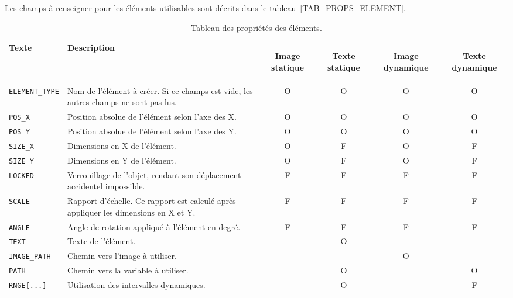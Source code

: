 \documentclass{AlstomLibrary}
\newcommand{\PROPSIZEX}{\index{Propriétés graphiques!SIZE\_X}\texttt{SIZE\_X}}
\newcommand{\PROPSIZEY}{\index{Propriétés graphiques!SIZE\_Y}\texttt{SIZE\_Y}}
\newcommand{\PROPPOSX}{\index{Propriétés graphiques!POS\_X}\texttt{POS\_X}}
\newcommand{\PROPPOSY}{\index{Propriétés graphiques!POS\_Y}\texttt{POS\_Y}}
\begin{document}
Les champs à renseigner pour les éléments utilisables sont décrits dans le tableau~\vref{TAB_PROPS_ELEMENT}.

\begin{table}\centering
\begin{tabular}{@{}lp{7cm}cccc}  \toprule%
Texte & Description & \begin{sideways}Image statique\end{sideways} & \begin{sideways}Texte statique\end{sideways} & \begin{sideways}Image dynamique\end{sideways} & \begin{sideways}Texte dynamique\end{sideways} \\
\midrule
\texttt{ELEMENT\_TYPE} & Nom de l'élément à créer. Si ce champs est vide, les autres champs ne sont pas lus. & O & O & O & O \\
\PROPPOSX  & Position absolue de l'élément selon l'axe des X. & O & O & O & O \\
\PROPPOSY  & Position absolue de l'élément selon l'axe des Y. & O & O & O & O \\
\PROPSIZEX  & Dimensions en X de l'élément. & O & F & O & F \\
\PROPSIZEY  & Dimensions en Y de l'élément. & O & F & O & F \\
\texttt{LOCKED} & Verrouillage de l'objet, rendant son déplacement accidentel impossible. & F & F & F & F \\
\texttt{SCALE} &  Rapport d'échelle. Ce rapport est calculé après appliquer les dimensions en X et Y. & F & F & F & F \\
\texttt{ANGLE} &  Angle de rotation appliqué à l'élément en degré. & F & F & F & F \\
\texttt{TEXT} &  Texte de l'élément. &  & O &  &  \\
\texttt{IMAGE\_PATH} &  Chemin vers l'image à utiliser. &  &  & O &  \\
\texttt{PATH} &  Chemin vers la variable à utiliser. &  & O &  & O \\
\texttt{RNGE[...]} & Utilisation des intervalles dynamiques. & & O & & F \\
\bottomrule
\end{tabular}
\caption{Tableau des propriétés des éléments.}\label{TAB_PROPS_ELEMENT}
\end{table}
\end{document}
